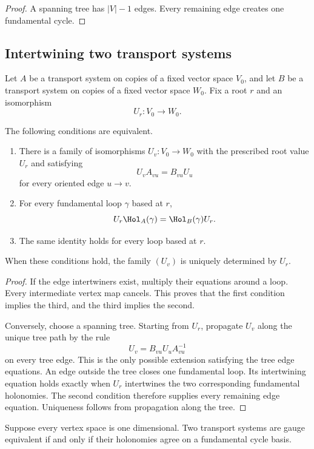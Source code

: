 \begin{proof}
A spanning tree has $|V|-1$ edges.  Every remaining edge creates one fundamental cycle.
\end{proof}


\subsection{Intertwining two transport systems}

Let $A$ be a transport system on copies of a fixed vector space $V_0$, and let $B$ be a transport system on copies of a fixed vector space $W_0$.  Fix a root $r$ and an isomorphism
\[
U_r:V_0\longrightarrow W_0.
\]

\begin{theorem}\label{thm:holonomy_intertwining}
The following conditions are equivalent.
\begin{enumerate}
\item There is a family of isomorphisms $U_v:V_0\to W_0$ with the prescribed root value $U_r$ and satisfying
\[
U_vA_{vu}=B_{vu}U_u
\]
for every oriented edge $u\to v$.
\item For every fundamental loop $\gamma$ based at $r$,
\[
U_r\Hol_A(\gamma)=\Hol_B(\gamma)U_r.
\]
\item The same identity holds for every loop based at $r$.
\end{enumerate}
When these conditions hold, the family $(U_v)$ is uniquely determined by $U_r$.
\end{theorem}

\begin{proof}
If the edge intertwiners exist, multiply their equations around a loop.  Every intermediate vertex map cancels.  This proves that the first condition implies the third, and the third implies the second.

Conversely, choose a spanning tree.  Starting from $U_r$, propagate $U_v$ along the unique tree path by the rule
\[
U_v=B_{vu}U_uA_{vu}^{-1}
\]
on every tree edge.  This is the only possible extension satisfying the tree edge equations.  An edge outside the tree closes one fundamental loop.  Its intertwining equation holds exactly when $U_r$ intertwines the two corresponding fundamental holonomies.  The second condition therefore supplies every remaining edge equation.  Uniqueness follows from propagation along the tree.
\end{proof}

\begin{corollary}\label{cor:scalar_holonomy_bridge}
Suppose every vertex space is one dimensional.  Two transport systems are gauge equivalent if and only if their holonomies agree on a fundamental cycle basis.
\end{corollary}

